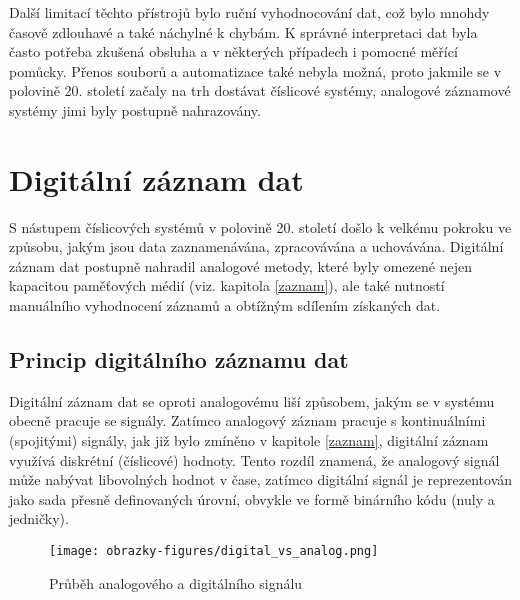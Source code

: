 Další limitací těchto přístrojů bylo ruční vyhodnocování dat, což bylo mnohdy časově zdlouhavé a také náchylné k chybám. K správné 
interpretaci dat byla často potřeba zkušená obsluha a v některých případech i pomocné měřící pomůcky. Přenos souborů a automatizace 
také nebyla možná, proto jakmile se v polovině 20. století začaly na trh dostávat číslicové systémy, analogové záznamové systémy 
jimi byly postupně nahrazovány. \cite{newcastle_history_of_digital_computers, florian_prechod_a_analog_do_digital}


\section{Digitální záznam dat}
\label{digitalni_zaznam_dat}
S nástupem číslicových systémů v polovině 20. století došlo k velkému pokroku ve způsobu, jakým jsou data zaznamenávána, 
zpracovávána a uchovávána. Digitální záznam dat postupně nahradil analogové metody, které byly omezené nejen kapacitou paměťových 
médií (viz. kapitola \ref{zaznam}), ale také nutností manuálního vyhodnocení záznamů a obtížným sdílením získaných dat.

\subsection{Princip digitálního záznamu dat}
Digitální záznam dat se oproti analogovému liší způsobem, jakým se v systému obecně pracuje se signály. Zatímco analogový záznam 
pracuje s kontinuálními (spojitými) signály, jak již bylo zmíněno v kapitole \ref{zaznam}, digitální záznam využívá diskrétní 
(číslicové) hodnoty. Tento rozdíl znamená, že analogový signál může nabývat libovolných hodnot v čase, zatímco digitální signál 
je reprezentován jako sada přesně definovaných úrovní, obvykle ve formě binárního kódu (nuly a jedničky).

\begin{figure}[h]
    \centering
    \texttt{[image: obrazky-figures/digital\_vs\_analog.png]}
    \caption{Průběh analogového a digitálního signálu}
    \label{fig:digital-vs-analog}
\end{figure}


